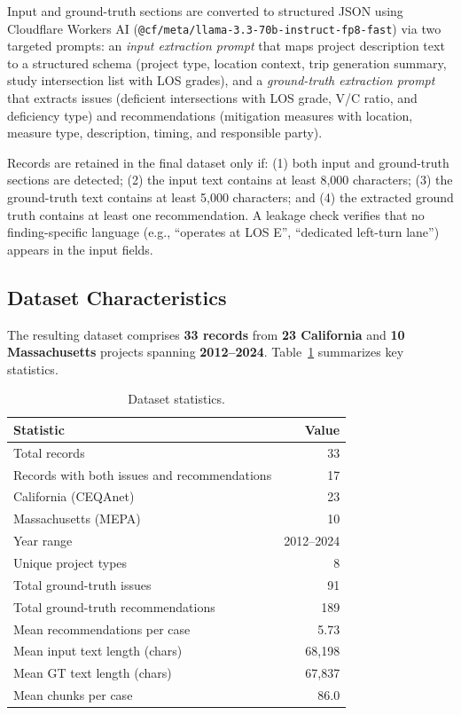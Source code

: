 \documentclass[preprint,12pt]{elsarticle}
\begin{document}
Input and ground-truth sections are converted to structured JSON using
Cloudflare Workers AI (\texttt{@cf/meta/llama-3.3-70b-instruct-fp8-fast})
via two targeted prompts:
an \emph{input extraction prompt} that maps project description text to a
structured schema (project type, location context, trip generation summary,
study intersection list with LOS grades), and a \emph{ground-truth extraction
prompt} that extracts issues (deficient intersections with LOS grade,
V/C ratio, and deficiency type) and recommendations (mitigation measures
with location, measure type, description, timing, and responsible party).

Records are retained in the final dataset only if:
(1) both input and ground-truth sections are detected;
(2) the input text contains at least 8{,}000 characters;
(3) the ground-truth text contains at least 5{,}000 characters; and
(4) the extracted ground truth contains at least one recommendation.
A leakage check verifies that no finding-specific language
(e.g., ``operates at LOS E'', ``dedicated left-turn lane'')
appears in the input fields.

\subsection{Dataset Characteristics}

The resulting dataset comprises \textbf{33 records} from \textbf{23
California} and \textbf{10 Massachusetts} projects spanning
\textbf{2012--2024}.
Table~\ref{tab:dataset} summarizes key statistics.

\begin{table}[h]
\centering
\caption{Dataset statistics.}
\label{tab:dataset}
\begin{tabular}{lr}
\toprule
Statistic & Value \\
\midrule
Total records & 33 \\
Records with both issues and recommendations & 17 \\
California (CEQAnet) & 23 \\
Massachusetts (MEPA) & 10 \\
Year range & 2012--2024 \\
Unique project types & 8 \\
Total ground-truth issues & 91 \\
Total ground-truth recommendations & 189 \\
Mean recommendations per case & 5.73 \\
Mean input text length (chars) & 68,198 \\
Mean GT text length (chars) & 67,837 \\
Mean chunks per case & 86.0 \\
\bottomrule
\end{tabular}
\end{table}
\end{document}
